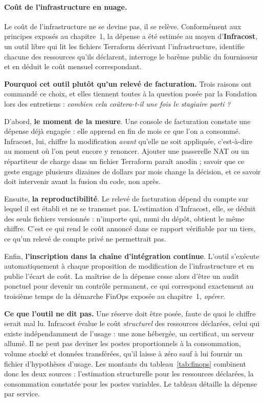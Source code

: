 \paragraph{Coût de l'infrastructure en nuage.}

Le coût de l'infrastructure ne se devine pas, il se relève. Conformément aux
principes exposés au chapitre~1, la dépense a été estimée au moyen
d'\textbf{Infracost}, un outil libre qui lit les fichiers Terraform décrivant
l'infrastructure, identifie chacune des ressources qu'ils déclarent, interroge
le barème public du fournisseur et en déduit le coût mensuel correspondant.

\textbf{Pourquoi cet outil plutôt qu'un relevé de facturation.} Trois raisons
ont commandé ce choix, et elles tiennent toutes à la question posée par la
Fondation lors des entretiens : \emph{combien cela coûtera-t-il une fois le
stagiaire parti ?}

D'abord, \textbf{le moment de la mesure}. Une console de facturation constate
une dépense déjà engagée : elle apprend en fin de mois ce que l'on a consommé.
Infracost, lui, chiffre la modification \emph{avant} qu'elle ne soit appliquée,
c'est-à-dire au moment où l'on peut encore y renoncer. Ajouter une passerelle
NAT ou un répartiteur de charge dans un fichier Terraform paraît anodin ; savoir
que ce geste engage plusieurs dizaines de dollars par mois change la décision,
et ce savoir doit intervenir avant la fusion du code, non après.

Ensuite, \textbf{la reproductibilité}. Le relevé de facturation dépend du compte
sur lequel il est établi et ne se transmet pas. L'estimation d'Infracost, elle,
se déduit des seuls fichiers versionnés : n'importe qui, muni du dépôt, obtient
le même chiffre. C'est ce qui rend le coût annoncé dans ce rapport vérifiable
par un tiers, ce qu'un relevé de compte privé ne permettrait pas.

Enfin, \textbf{l'inscription dans la chaîne d'intégration continue}. L'outil
s'exécute automatiquement à chaque proposition de modification de
l'infrastructure et en publie l'écart de coût. La maîtrise de la dépense cesse
alors d'être un audit ponctuel pour devenir un contrôle permanent, ce qui
correspond exactement au troisième temps de la démarche FinOps exposée au
chapitre~1, \emph{opérer}.

\textbf{Ce que l'outil ne dit pas.} Une réserve doit être posée, faute de quoi
le chiffre serait mal lu. Infracost évalue le coût \emph{structurel} des
ressources déclarées, celui qui existe indépendamment de l'usage : une zone
hébergée, un certificat, un serveur allumé. Il ne peut pas deviner les postes
proportionnels à la consommation, volume stocké et données transférées, qu'il
laisse à zéro sauf à lui fournir un fichier d'hypothèses d'usage. Les montants
du tableau~\ref{tab:finops} combinent donc les deux sources : l'estimation
structurelle pour les ressources déclarées, la consommation constatée pour les
postes variables. Le tableau détaille la dépense par service.

